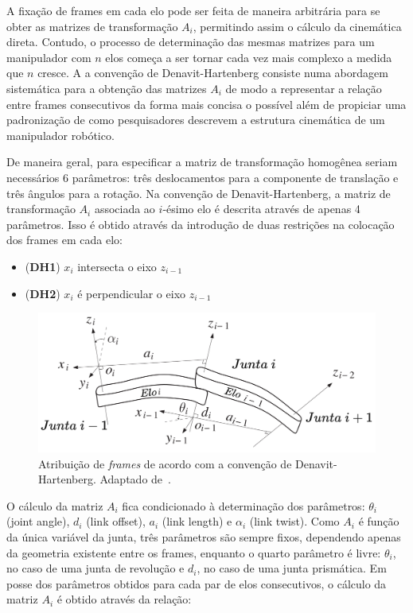 A fixação de frames em cada elo pode ser feita de maneira arbitrária para se
obter as matrizes de transformação $A_i$, permitindo assim o cálculo da
cinemática direta. Contudo, o processo de determinação das mesmas matrizes para
um manipulador com $n$ elos começa a ser tornar cada vez mais complexo a medida
que $n$ cresce. A a convenção de Denavit-Hartenberg consiste numa abordagem
sistemática para a obtenção das matrizes $A_i$ de modo a representar a relação
entre frames consecutivos da forma mais concisa o possível além de propiciar
uma padronização de como pesquisadores descrevem a estrutura cinemática de um
manipulador robótico.

De maneira geral, para especificar a matriz de transformação homogênea seriam
necessários 6 parâmetros: três deslocamentos para a componente de translação e
três ângulos para a rotação. Na convenção de Denavit-Hartenberg, a matriz de
transformação $A_i$ associada ao $i$-ésimo elo é descrita através de apenas 4
parâmetros. Isso é obtido através da introdução de duas restrições na colocação
dos frames em cada elo:

\begin{itemize}
    \item (\textbf{DH1}) $x_i$ intersecta o eixo $z_{i-1}$
    \item (\textbf{DH2}) $x_i$ é perpendicular o eixo $z_{i-1}$
\end{itemize}

\begin{figure}
    \centering
    \includegraphics[width=0.8\linewidth]{Images/dh-assignment.png}
    \caption{Atribuição de \emph{frames} de acordo com a convenção de Denavit-Hartenberg. Adaptado de~\cite{spong_robot_2020}.}\label{fig:dh-assignment}
\end{figure}

O cálculo da matriz $A_i$ fica condicionado à determinação dos parâmetros:
$\theta_i$ (joint angle), $d_i$ (link offset), $a_i$ (link length) e $\alpha_i$
(link twist). Como $A_i$ é função da única variável da junta, três parâmetros
são sempre fixos, dependendo apenas da geometria existente entre os frames,
enquanto o quarto parâmetro é livre: $\theta_i$, no caso de uma junta de
revolução e $d_i$, no caso de uma junta prismática. Em posse dos parâmetros
obtidos para cada par de elos consecutivos, o cálculo da matriz $A_i$ é obtido
através da relação:

